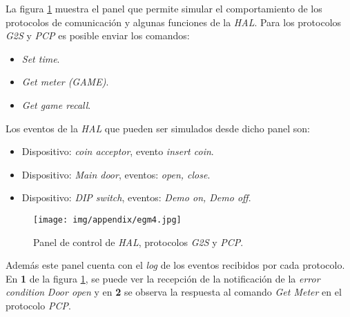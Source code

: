 La figura \ref{fig:appendix:egm4} muestra el panel que permite simular el comportamiento de los protocolos de 
comunicaci\'on y algunas funciones de la \textit{HAL}. Para los protocolos \textit{G2S} y \textit{PCP} es posible enviar los comandos:

\begin{itemize}
 \item \textit{Set time}.
 \item \textit{Get meter (GAME)}.
 \item \textit{Get game recall}.
\end{itemize}

Los eventos de la \textit{HAL} que pueden ser simulados desde dicho panel son:

\begin{itemize}
 \item Dispositivo: \textit{coin acceptor}, evento \textit{insert coin}.
 \item Dispositivo: \textit{Main door}, eventos: \textit{open, close}.
 \item Dispositivo: \textit{DIP switch}, eventos: \textit{Demo on, Demo off}.
\end{itemize}

\clearpage
\begin{figure}[ht!]
\centering
\texttt{[image: img/appendix/egm4.jpg]}
\caption{Panel de control de \textit{HAL}, protocolos \textit{G2S} y \textit{PCP}.}
\label{fig:appendix:egm4}
\end{figure}

Adem\'as este panel cuenta con el \textit{log} de los eventos recibidos por cada protocolo. En \textbf{1} de la figura \ref{fig:appendix:egm4}, se puede ver la recepci\'on de la
notificaci\'on de la \textit{error condition} \textit{Door open} y en \textbf{2} se observa la respuesta al comando \textit{Get Meter} en el protocolo \textit{PCP}.


\ifx\all\undefined

\fi